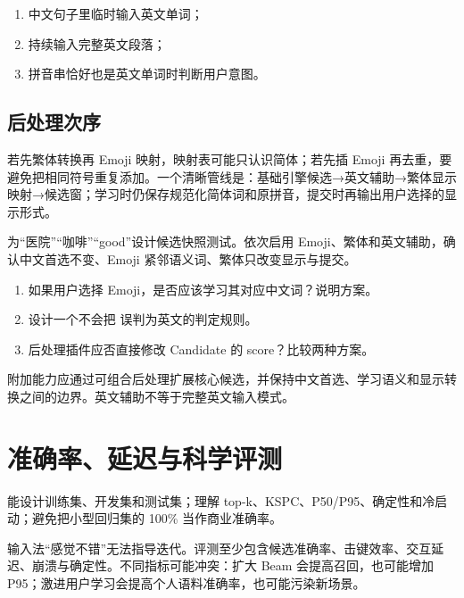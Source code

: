 \begin{enumerate}
  \item 中文句子里临时输入英文单词；
  \item 持续输入完整英文段落；
  \item 拼音串恰好也是英文单词时判断用户意图。
\end{enumerate}



\section{后处理次序}

若先繁体转换再 Emoji 映射，映射表可能只认识简体；若先插 Emoji 再去重，要避免把相同符号重复添加。一个清晰管线是：基础引擎候选→英文辅助→繁体显示映射→候选窗；学习时仍保存规范化简体词和原拼音，提交时再输出用户选择的显示形式。

\begin{lab}[插件稳定性]
为“医院”“咖啡”“good”设计候选快照测试。依次启用 Emoji、繁体和英文辅助，确认中文首选不变、Emoji 紧邻语义词、繁体只改变显示与提交。
\end{lab}

\exercises
\begin{enumerate}
  \item 如果用户选择 Emoji，是否应该学习其对应中文词？说明方案。
  \item 设计一个不会把  误判为英文的判定规则。
  \item 后处理插件应否直接修改 Candidate 的 score？比较两种方案。
\end{enumerate}

\begin{summarybox}
附加能力应通过可组合后处理扩展核心候选，并保持中文首选、学习语义和显示转换之间的边界。英文辅助不等于完整英文输入模式。
\end{summarybox}


\chapter{准确率、延迟与科学评测}

\begin{goals}
能设计训练集、开发集和测试集；理解 top-k、KSPC、P50/P95、确定性和冷启动；避免把小型回归集的 100\% 当作商业准确率。
\end{goals}

输入法“感觉不错”无法指导迭代。评测至少包含候选准确率、击键效率、交互延迟、崩溃与确定性。不同指标可能冲突：扩大 Beam 会提高召回，也可能增加 P95；激进用户学习会提高个人语料准确率，也可能污染新场景。

